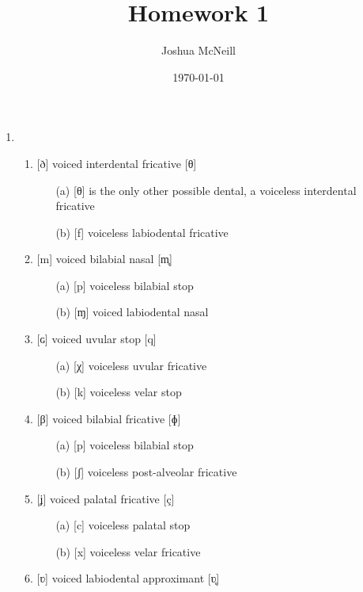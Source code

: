 \documentclass{article}
\author{Joshua McNeill}
\title{Homework 1}
\date{\today}
\begin{document}
  \maketitle
  \begin{enumerate}
    \item \begin{enumerate}
            \item {[}ð] voiced interdental fricative [θ]
            \begin{enumerate}
              \item[(a)] {[}θ] is the only other possible dental, a voiceless interdental fricative
              \item[(b)] {[}f] voiceless labiodental fricative
            \end{enumerate}
            \item {[}m] voiced bilabial nasal [m̥]
            \begin{enumerate}
              \item[(a)] {[}p] voiceless bilabial stop
              \item[(b)] {[}ɱ] voiced labiodental nasal
            \end{enumerate}
            \item {[}ɢ] voiced uvular stop [q]
            \begin{enumerate}
              \item[(a)] {[}χ] voiceless uvular fricative
              \item[(b)] {[}k] voiceless velar stop
            \end{enumerate}
            \item {[}β] voiced bilabial fricative [ɸ]
            \begin{enumerate}
              \item[(a)] {[}p] voiceless bilabial stop
              \item[(b)] {[}ʃ] voiceless post-alveolar fricative
            \end{enumerate}
            \item {[}ʝ] voiced palatal fricative [ç]
            \begin{enumerate}
              \item[(a)] {[}c] voiceless palatal stop
              \item[(b)] {[}x] voiceless velar fricative
            \end{enumerate}
            \item {[}ʋ] voiced labiodental approximant [ʋ̥]

\end{enumerate}
\end{enumerate}
\end{document}
